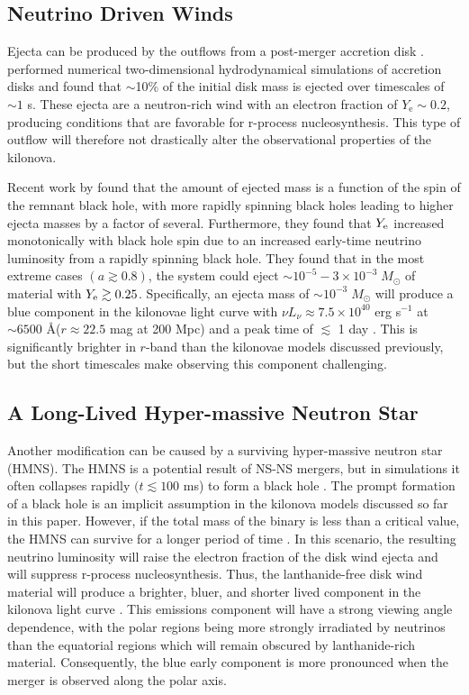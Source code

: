 \subsection{Neutrino Driven Winds}
\label{sec:ch2_neutrino}
Ejecta can be produced by the outflows from a post-merger accretion disk \citep{Dessart+09,FernandezMetzger13,Fernandez+15}. \citet{FernandezMetzger13} performed numerical two-dimensional hydrodynamical simulations of accretion disks and found that $\sim$10\% of the initial disk mass is ejected over timescales of $\sim1$ s. These ejecta are a neutron-rich wind with an electron fraction of $Y_{\text{e}} \sim 0.2$, producing conditions that are favorable for r-process nucleosynthesis. This type of outflow will therefore not drastically alter the observational properties of the kilonova. 

Recent work by \citet{Fernandez+15} found that the amount of ejected mass is a function of the spin of the remnant black hole, with more rapidly spinning black holes leading to higher ejecta masses by a factor of several. Furthermore, they found that $Y_{{\rm e}}$ increased monotonically with black hole spin due to an increased early-time neutrino luminosity from a rapidly spinning black hole. They found that in the most extreme cases $(a \gtrsim 0.8)$, the system could eject $\sim10^{-5} - 3\times10^{-3}\;M_{\odot}$ of material with $Y_{{\rm e}} \gtrsim 0.25$. Specifically, an ejecta mass of $\sim10^{-3}\;M_{\odot}$ will produce a blue component in the kilonovae light curve with $\nu L_{\nu} \approx 7.5\times10^{40}$ erg s$^{-1}$ at $\sim6500$ \AA ($r \approx 22.5$ mag at 200 Mpc) and a peak time of $\lesssim$ 1 day \citep{Kasen+15}. This is significantly brighter in $r$-band than the kilonovae models discussed previously, but the short timescales make observing this component challenging.

\clearpage
\subsection{A Long-Lived Hyper-massive Neutron Star}
\label{sec:ch2_HMNS}
Another modification can be caused by a  surviving hyper-massive neutron star (HMNS). The HMNS is a potential result of NS-NS mergers, but in simulations it often collapses rapidly $(t \lesssim 100$ ms) to form a black hole \citep{Sekiguchi+11}. The prompt formation of a black hole is an implicit assumption in the kilonova models discussed so far in this paper. However, if the total mass of the binary is less than a critical value, the HMNS can survive for a longer period of time \citep{Bauswein+13a,Kaplan+14}. In this scenario, the resulting neutrino luminosity will raise the electron fraction of the disk wind ejecta and will suppress r-process nucleosynthesis. Thus, the lanthanide-free disk wind material will produce a brighter, bluer, and shorter lived component in the kilonova light curve \citep[see e.g.,][and references therein]{MetzgerPiro14,MetzgerFernandez14}. This emissions component will have a strong viewing angle dependence, with the polar regions being more strongly irradiated by neutrinos than the equatorial regions which will remain obscured by lanthanide-rich material. Consequently, the blue early component is more pronounced when the merger is observed along the polar axis. 

